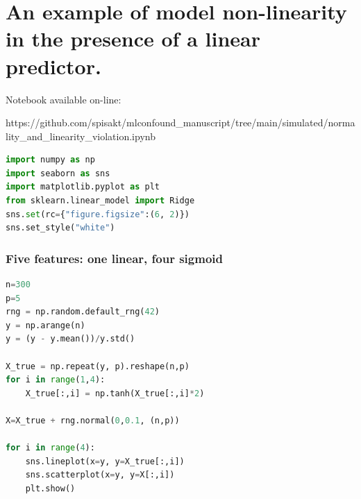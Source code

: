 \hypertarget{an-example-of-model-non-linearity-in-the-presence-of-a-linear-predictor.}{%
\section{An example of model non-linearity in the presence of a linear
predictor.}\label{an-example-of-model-non-linearity-in-the-presence-of-a-linear-predictor.}}
\label{sup:nomlinviol}

Notebook available on-line:

https://github.com/spisakt/mlconfound\_manuscript/tree/main/simulated/normality\_and\_linearity\_violation.ipynb

\begin{lstlisting}[language=Python]
import numpy as np
import seaborn as sns
import matplotlib.pyplot as plt
from sklearn.linear_model import Ridge
sns.set(rc={"figure.figsize":(6, 2)})
sns.set_style("white")
\end{lstlisting}

\hypertarget{five-features-one-linear-four-sigmoid}{%
\subsubsection{Five features: one linear, four
sigmoid}\label{five-features-one-linear-four-sigmoid}}

\begin{lstlisting}[language=Python]
n=300
p=5
rng = np.random.default_rng(42)
y = np.arange(n)
y = (y - y.mean())/y.std()

X_true = np.repeat(y, p).reshape(n,p)
for i in range(1,4):
    X_true[:,i] = np.tanh(X_true[:,i]*2)

X=X_true + rng.normal(0,0.1, (n,p))

for i in range(4):
    sns.lineplot(x=y, y=X_true[:,i])
    sns.scatterplot(x=y, y=X[:,i])
    plt.show()
\end{lstlisting}

